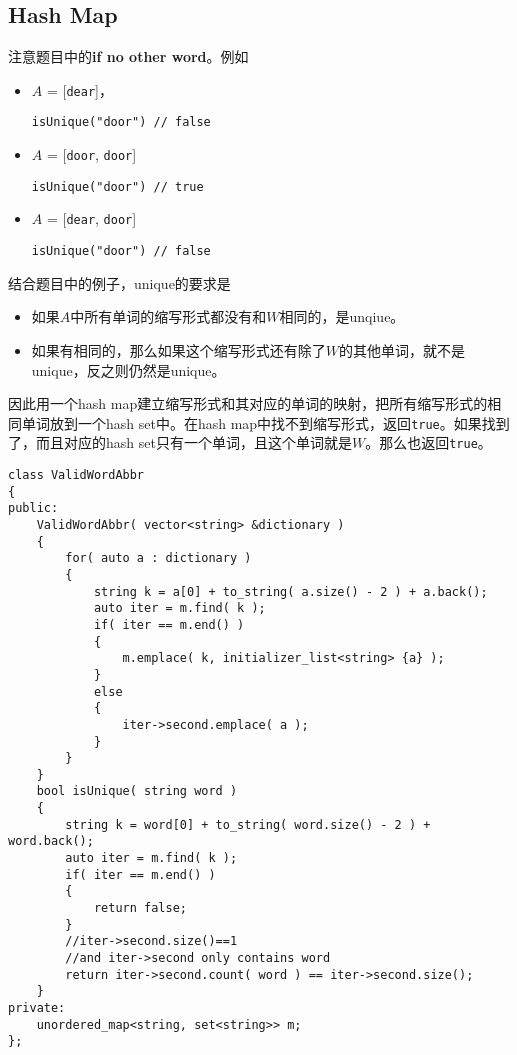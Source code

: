 \subsection{Hash Map}
注意题目中的\textbf{if no other word}。例如
\begin{itemize}
\item $A$ = [\texttt{dear}]，
\begin{lstlisting}[style=customc]
isUnique("door") // false
\end{lstlisting}
\item $A$ = [\texttt{door}, \texttt{door}]
\begin{lstlisting}[style=customc]
isUnique("door") // true
\end{lstlisting}
\item $A$ = [\texttt{dear}, \texttt{door}]
\begin{lstlisting}[style=customc]
isUnique("door") // false
\end{lstlisting}
\end{itemize}
结合题目中的例子，unique的要求是
\begin{itemize}
\item 如果$A$中所有单词的缩写形式都没有和$W$相同的，是unqiue。
\item 如果有相同的，那么如果这个缩写形式还有除了$W$的其他单词，就不是unique，反之则仍然是unique。
\end{itemize}
因此用一个hash map建立缩写形式和其对应的单词的映射，把所有缩写形式的相同单词放到一个hash set中。在hash map中找不到缩写形式，返回\texttt{true}。如果找到了，而且对应的hash set只有一个单词，且这个单词就是$W$。那么也返回\texttt{true}。
\setcounter{lstlisting}{0}
\begin{lstlisting}[style=customc, caption={Hash Map}]
class ValidWordAbbr
{
public:
    ValidWordAbbr( vector<string> &dictionary )
    {
        for( auto a : dictionary )
        {
            string k = a[0] + to_string( a.size() - 2 ) + a.back();
            auto iter = m.find( k );
            if( iter == m.end() )
            {
                m.emplace( k, initializer_list<string> {a} );
            }
            else
            {
                iter->second.emplace( a );
            }
        }
    }
    bool isUnique( string word )
    {
        string k = word[0] + to_string( word.size() - 2 ) + word.back();
        auto iter = m.find( k );
        if( iter == m.end() )
        {
            return false;
        }
        //iter->second.size()==1
        //and iter->second only contains word
        return iter->second.count( word ) == iter->second.size();
    }
private:
    unordered_map<string, set<string>> m;
};
\end{lstlisting}
